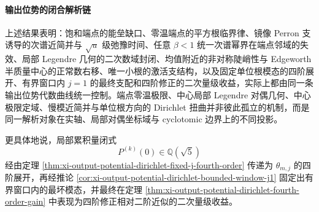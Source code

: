 \paragraph{输出位势的闭合解析链}
上述结果表明：饱和端点的能垒缺口、零温端点的平方根临界律、镜像 Perron 支诱导的次谱近简并与 \(\sqrt u\) 级弛豫时间、任意 \(\beta<1\) 统一次谱幂界在端点邻域的失效、局部 Legendre 几何的二次数域封闭、均值附近的非对称陡峭性与 Edgeworth 半质量中心的正常数右移、唯一小根的激活支结构，以及固定单位根模态的四阶展开、有界窗口内 \(j=1\) 的最终支配和四阶修正的二次量级收益，实际上都由同一条输出位势代数曲线统一控制。端点零温极限、中心局部 Legendre 对偶几何、中心极限定域、慢模近简并与单位根方向的 Dirichlet 扭曲并非彼此孤立的机制，而是同一解析对象在实轴、局部对偶坐标域与 cyclotomic 边界上的不同投影。

更具体地说，局部累积量闭式
\[
P^{(k)}(0)\in\mathbb Q(\sqrt5)
\]
经由定理 \ref{thm:xi-output-potential-dirichlet-fixed-j-fourth-order} 传递为 \(\theta_{m,j}\) 的四阶展开，再经推论 \ref{cor:xi-output-potential-dirichlet-bounded-window-j1} 固定出有界窗口内的最坏模态，并最终在定理 \ref{thm:xi-output-potential-dirichlet-fourth-order-gain} 中表现为四阶修正相对二阶近似的二次量级收益。
